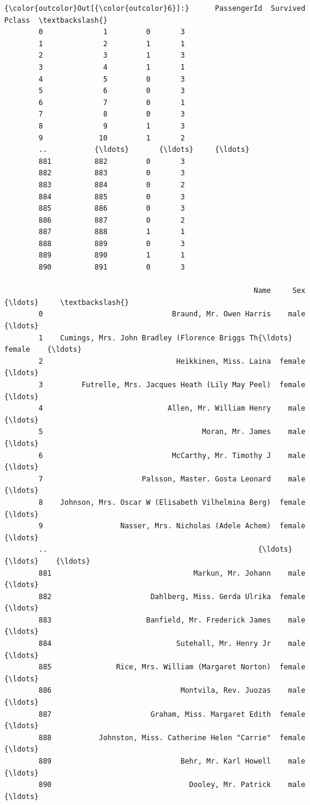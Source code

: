 \documentclass[11pt]{ctexart}
\begin{document}
\begin{Verbatim}[commandchars=\\\{\}]
{\color{outcolor}Out[{\color{outcolor}6}]:}      PassengerId  Survived  Pclass  \textbackslash{}
        0              1         0       3   
        1              2         1       1   
        2              3         1       3   
        3              4         1       1   
        4              5         0       3   
        5              6         0       3   
        6              7         0       1   
        7              8         0       3   
        8              9         1       3   
        9             10         1       2   
        ..           {\ldots}       {\ldots}     {\ldots}   
        881          882         0       3   
        882          883         0       3   
        883          884         0       2   
        884          885         0       3   
        885          886         0       3   
        886          887         0       2   
        887          888         1       1   
        888          889         0       3   
        889          890         1       1   
        890          891         0       3   
        
                                                          Name     Sex    {\ldots}     \textbackslash{}
        0                              Braund, Mr. Owen Harris    male    {\ldots}      
        1    Cumings, Mrs. John Bradley (Florence Briggs Th{\ldots}  female    {\ldots}      
        2                               Heikkinen, Miss. Laina  female    {\ldots}      
        3         Futrelle, Mrs. Jacques Heath (Lily May Peel)  female    {\ldots}      
        4                             Allen, Mr. William Henry    male    {\ldots}      
        5                                     Moran, Mr. James    male    {\ldots}      
        6                              McCarthy, Mr. Timothy J    male    {\ldots}      
        7                       Palsson, Master. Gosta Leonard    male    {\ldots}      
        8    Johnson, Mrs. Oscar W (Elisabeth Vilhelmina Berg)  female    {\ldots}      
        9                  Nasser, Mrs. Nicholas (Adele Achem)  female    {\ldots}      
        ..                                                 {\ldots}     {\ldots}    {\ldots}      
        881                                 Markun, Mr. Johann    male    {\ldots}      
        882                       Dahlberg, Miss. Gerda Ulrika  female    {\ldots}      
        883                      Banfield, Mr. Frederick James    male    {\ldots}      
        884                             Sutehall, Mr. Henry Jr    male    {\ldots}      
        885               Rice, Mrs. William (Margaret Norton)  female    {\ldots}      
        886                              Montvila, Rev. Juozas    male    {\ldots}      
        887                       Graham, Miss. Margaret Edith  female    {\ldots}      
        888           Johnston, Miss. Catherine Helen "Carrie"  female    {\ldots}      
        889                              Behr, Mr. Karl Howell    male    {\ldots}      
        890                                Dooley, Mr. Patrick    male    {\ldots}      
        

\end{Verbatim}
\end{document}
